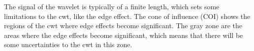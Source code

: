 The signal of the wavelet is typically of a finite length, which sets some limitations to the cwt, like the edge effect. The cone of influence (COI) shows the regions of the cwt where edge effects become significant. The gray zone are the areas where the edge effects become significant, which means that there will be some uncertainties to the cwt in this zone. \cite{math}


